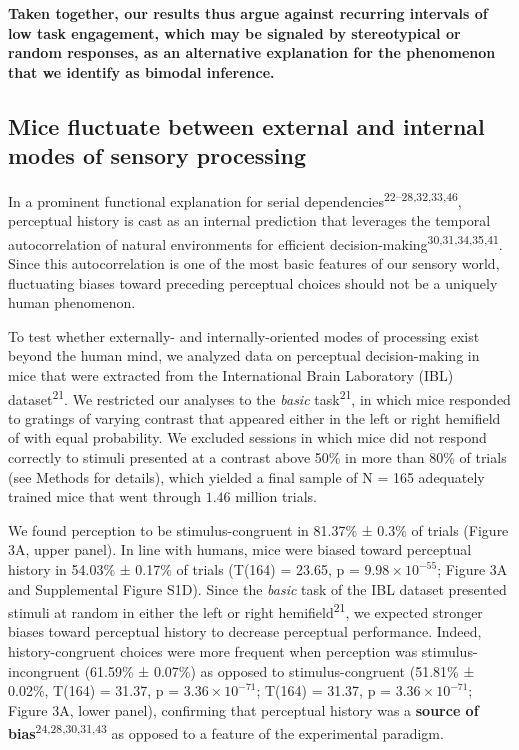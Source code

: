 \documentclass[
]{article}
\begin{document}
\textbf{Taken together, our results thus argue against recurring
intervals of low task engagement, which may be signaled by stereotypical
or random responses, as an alternative explanation for the phenomenon
that we identify as bimodal inference.}

\hypertarget{mice-fluctuate-between-external-and-internal-modes-of-sensory-processing}{%
\subsection{Mice fluctuate between external and internal modes of
sensory
processing}\label{mice-fluctuate-between-external-and-internal-modes-of-sensory-processing}}

In a prominent functional explanation for serial
dependencies\textsuperscript{22--28,32,33,46}, perceptual history is
cast as an internal prediction that leverages the temporal
autocorrelation of natural environments for efficient
decision-making\textsuperscript{30,31,34,35,41}. Since this
autocorrelation is one of the most basic features of our sensory world,
fluctuating biases toward preceding perceptual choices should not be a
uniquely human phenomenon.

To test whether externally- and internally-oriented modes of processing
exist beyond the human mind, we analyzed data on perceptual
decision-making in mice that were extracted from the International Brain
Laboratory (IBL) dataset\textsuperscript{21}. We restricted our analyses
to the \emph{basic} task\textsuperscript{21}, in which mice responded to
gratings of varying contrast that appeared either in the left or right
hemifield of with equal probability. We excluded sessions in which mice
did not respond correctly to stimuli presented at a contrast above 50\%
in more than 80\% of trials (see Methods for details), which yielded a
final sample of N = 165 adequately trained mice that went through
\(1.46\) million trials.

We found perception to be stimulus-congruent in 81.37\% ± 0.3\% of
trials (Figure 3A, upper panel). In line with humans, mice were biased
toward perceptual history in 54.03\% ± 0.17\% of trials (T(164) = 23.65,
p = \(\ensuremath{9.98\times 10^{-55}}\); Figure 3A and Supplemental
Figure S1D). Since the \emph{basic} task of the IBL dataset presented
stimuli at random in either the left or right
hemifield\textsuperscript{21}, we expected stronger biases toward
perceptual history to decrease perceptual performance. Indeed,
history-congruent choices were more frequent when perception was
stimulus-incongruent (61.59\% ± 0.07\%) as opposed to stimulus-congruent
(51.81\% ± 0.02\%, T(164) = 31.37, p =
\(\ensuremath{3.36\times 10^{-71}}\); T(164) = 31.37, p =
\(\ensuremath{3.36\times 10^{-71}}\); Figure 3A, lower panel),
confirming that perceptual history was a \textbf{source of
bias}\textsuperscript{24,28,30,31,43} as opposed to a feature of the
experimental paradigm.
\end{document}
